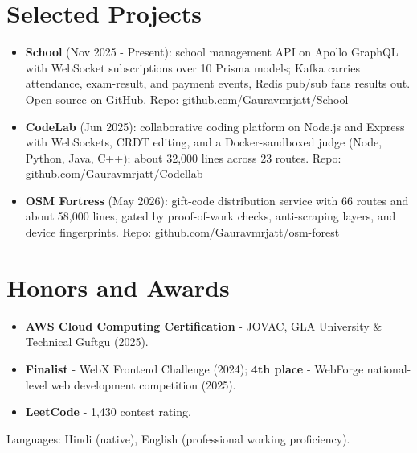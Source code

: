 \documentclass[11pt,a4paper,sans]{moderncv}
\begin{document}
\section{Selected Projects}
\vspace{1pt}
\begin{itemize}
    \item {\textbf{School} (Nov 2025 - Present): school management API on Apollo GraphQL with WebSocket subscriptions over 10 Prisma models; Kafka carries attendance, exam-result, and payment events, Redis pub/sub fans results out. Open-source on GitHub. Repo: github.com/Gauravmrjatt/School}
    \item {\textbf{CodeLab} (Jun 2025): collaborative coding platform on Node.js and Express with WebSockets, CRDT editing, and a Docker-sandboxed judge (Node, Python, Java, C++); about 32,000 lines across 23 routes. Repo: github.com/Gauravmrjatt/Codellab}
    \item {\textbf{OSM Fortress} (May 2026): gift-code distribution service with 66 routes and about 58,000 lines, gated by proof-of-work checks, anti-scraping layers, and device fingerprints. Repo: github.com/Gauravmrjatt/osm-forest}
\end{itemize}


\section{Honors and Awards}
\vspace{1pt}
\begin{itemize}
    \item {\textbf{AWS Cloud Computing Certification} - JOVAC, GLA University \& Technical Guftgu (2025).}
    \item {\textbf{Finalist} - WebX Frontend Challenge (2024); \textbf{4th place} - WebForge national-level web development competition (2025).}
    \item {\textbf{LeetCode} - 1,430 contest rating.}
\end{itemize}


\vspace{2pt}
\small{Languages: Hindi (native), English (professional working proficiency).}
\end{document}
